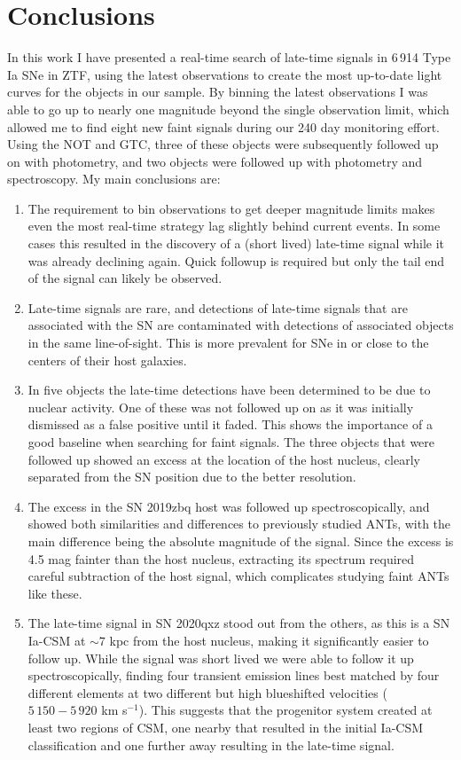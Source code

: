 \documentclass[a4paper,oneside,12pt, class=Latex/Classes/PhDthesisPSnPDF, crop=false]{standalone}
\begin{document}
\section{Conclusions}
\label{conclusion}
In this work I have presented a real-time search of late-time signals in 6\,914 Type Ia SNe in ZTF, using the latest observations to create the most up-to-date light curves for the objects in our sample. By binning the latest observations I was able to go up to nearly one magnitude beyond the single observation limit, which allowed me to find eight new faint signals during our 240 day monitoring effort. Using the NOT and GTC, three of these objects were subsequently followed up on with photometry, and two objects were followed up with photometry and spectroscopy. My main conclusions are:

\begin{enumerate}
    \item The requirement to bin observations to get deeper magnitude limits makes even the most real-time strategy lag slightly behind current events. In some cases this resulted in the discovery of a (short lived) late-time signal while it was already declining again. Quick followup is required but only the tail end of the signal can likely be observed.
    \item Late-time signals are rare, and detections of late-time signals that are associated with the SN are contaminated with detections of associated objects in the same line-of-sight. This is more prevalent for SNe in or close to the centers of their host galaxies.
    \item In five objects the late-time detections have been determined to be due to nuclear activity. One of these was not followed up on as it was initially dismissed as a false positive until it faded. This shows the importance of a good baseline when searching for faint signals. The three objects that were followed up showed an excess at the location of the host nucleus, clearly separated from the SN position due to the better resolution.
    \item The excess in the SN 2019zbq host was followed up spectroscopically, and showed both similarities and differences to previously studied ANTs, with the main difference being the absolute magnitude of the signal. Since the excess is 4.5 mag fainter than the host nucleus, extracting its spectrum required careful subtraction of the host signal, which complicates studying faint ANTs like these.
    \item The late-time signal in SN 2020qxz stood out from the others, as this is a SN Ia-CSM at $\sim7$ kpc from the host nucleus, making it significantly easier to follow up. While the signal was short lived we were able to follow it up spectroscopically, finding four transient emission lines best matched by four different elements at two different but high blueshifted velocities ($5\,150 - 5\,920$ km s$^{-1}$). This suggests that the progenitor system created at least two regions of CSM, one nearby that resulted in the initial Ia-CSM classification and one further away resulting in the late-time signal.
\end{enumerate}
\end{document}
